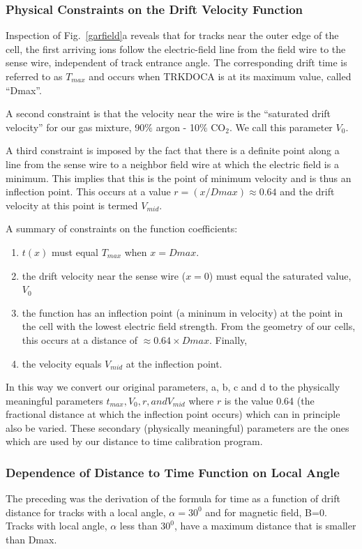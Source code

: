 \subsubsection{Physical Constraints on the Drift Velocity Function}

Inspection of  Fig.~\ref{garfield}a reveals that for tracks near the outer
edge of the cell, the first arriving ions follow the electric-field line from 
the field wire to the sense wire, independent of track entrance angle.  The
corresponding drift time is referred to as $T_{max}$ and occurs when TRKDOCA is at its maximum value,
called ``Dmax''.

A second constraint is that the velocity near the wire is the ``saturated drift
velocity'' for our gas mixture, 90$\%$ argon - 10$\%$ CO$_2$.  We call this parameter $V_0$.

A third constraint is imposed by the fact that there is a definite point along
a line from the sense wire to a neighbor field wire at which the electric field 
is a minimum.  This implies that this is the point
of minimum velocity and is thus an inflection point.  This occurs at a value
$r = (x/Dmax) \approx 0.64$ and the drift velocity at this point is termed $V_{mid}$.

A summary of constraints on the function coefficients:
\begin{enumerate}
\item  $t(x)$ must equal $T_{max}$ when $x = Dmax $.
\item  the drift velocity near the sense wire ($x = 0$)
must equal the saturated value, $V_0$
\item the function has an inflection point (a
mininum in velocity) at the point in the cell with the lowest electric field
strength.  From the geometry of our cells, this occurs at a distance
of $\approx 0.64 \times Dmax$.  Finally,
\item the velocity equals $V_{mid}$ at the inflection point.
\end{enumerate}

In this way we convert our original parameters, a, b, c and d to the physically meaningful
parameters $t_{max}, V_0, r, and V_{mid}$ where $r$ is the value 0.64 (the fractional distance
at which the inflection point occurs) which can in principle also be varied.
These secondary (physically meaningful) parameters are the ones which are used
by our distance to time calibration program.

\subsubsection{Dependence of Distance to Time Function on Local Angle}
The preceding was the derivation of the formula for time as a function
of drift distance for tracks with a local angle, $\alpha = 30^0$ and for magnetic field, B=0.
Tracks with local angle, $\alpha$ less than $30^0$, have a maximum distance that is
smaller than Dmax.  

